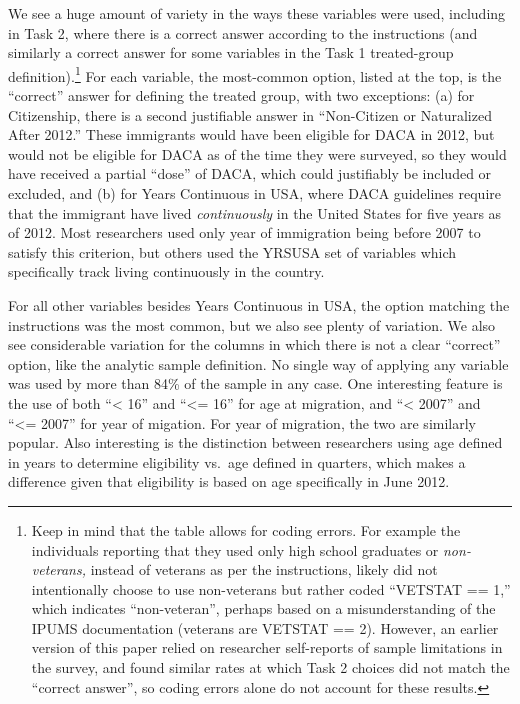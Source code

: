 \documentclass[
  letterpaper,
  DIV=11,
  numbers=noendperiod]{scrartcl}
\begin{document}
We see a huge amount of variety in the ways these variables were used,
including in Task 2, where there is a correct answer according to the
instructions (and similarly a correct answer for some variables in the
Task 1 treated-group definition).\footnote{Keep in mind that the table
  allows for coding errors. For example the individuals reporting that
  they used only high school graduates or \emph{non-veterans,} instead
  of veterans as per the instructions, likely did not intentionally
  choose to use non-veterans but rather coded ``VETSTAT == 1,'' which
  indicates ``non-veteran'', perhaps based on a misunderstanding of the
  IPUMS documentation (veterans are VETSTAT == 2). However, an earlier
  version of this paper relied on researcher self-reports of sample
  limitations in the survey, and found similar rates at which Task 2
  choices did not match the ``correct answer'', so coding errors alone
  do not account for these results.} For each variable, the most-common
option, listed at the top, is the ``correct'' answer for defining the
treated group, with two exceptions: (a) for Citizenship, there is a
second justifiable answer in ``Non-Citizen or Naturalized After 2012.''
These immigrants would have been eligible for DACA in 2012, but would
not be eligible for DACA as of the time they were surveyed, so they
would have received a partial ``dose'' of DACA, which could justifiably
be included or excluded, and (b) for Years Continuous in USA, where DACA
guidelines require that the immigrant have lived \emph{continuously} in
the United States for five years as of 2012. Most researchers used only
year of immigration being before 2007 to satisfy this criterion, but
others used the YRSUSA set of variables which specifically track living
continuously in the country.

For all other variables besides Years Continuous in USA, the option
matching the instructions was the most common, but we also see plenty of
variation. We also see considerable variation for the columns in which
there is not a clear ``correct'' option, like the analytic sample
definition. No single way of applying any variable was used by more than
84\% of the sample in any case. One interesting feature is the use of
both ``\textless{} 16'' and ``\textless= 16'' for age at migration, and
``\textless{} 2007'' and ``\textless= 2007'' for year of migation. For
year of migration, the two are similarly popular. Also interesting is
the distinction between researchers using age defined in years to
determine eligibility vs.~age defined in quarters, which makes a
difference given that eligibility is based on age specifically in June
2012.
\end{document}
